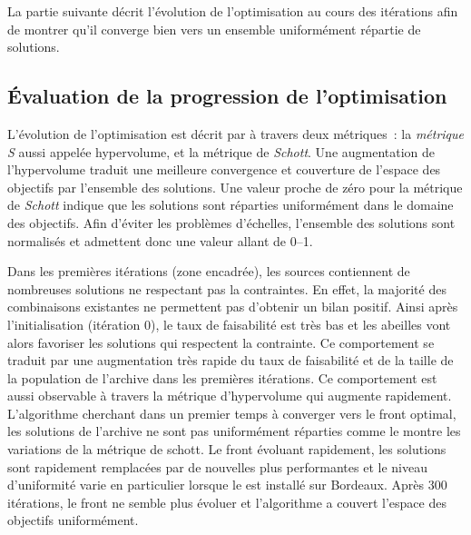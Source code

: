 La partie suivante décrit l’évolution de l’optimisation au cours des itérations
afin de montrer qu’il converge bien vers un ensemble uniformément répartie de solutions.



\subsection{Évaluation de la progression de l’optimisation} %
\label{sub:evaluation_de_la_progression_de_l_optimisation}
L’évolution de l’optimisation est décrit par  à
travers deux métriques~: la \textit{métrique S} aussi appelée hypervolume, et la métrique
de \textit{Schott}. Une augmentation de l’hypervolume traduit une meilleure convergence et
couverture de l’espace des objectifs par l’ensemble des solutions. Une valeur proche de
zéro pour la métrique de \textit{Schott} indique que les solutions sont réparties
uniformément dans le domaine des objectifs. Afin d’éviter les problèmes d’échelles,
l’ensemble des solutions sont normalisés et admettent donc une valeur allant de
\SIrange{0}{1}{}.

Dans les premières itérations (zone encadrée), les sources contiennent de nombreuses
solutions ne respectant pas la contraintes. En effet, la majorité des combinaisons
existantes ne permettent pas d’obtenir un bilan positif. Ainsi après l’initialisation
(itération $0$), le taux de faisabilité est très bas et les abeilles vont alors favoriser
les solutions qui respectent la contrainte. Ce comportement se traduit par une
augmentation très rapide du taux de faisabilité et de la taille de la population de
l’archive dans les premières itérations. Ce comportement est aussi observable à travers la
métrique d’hypervolume qui augmente rapidement. L’algorithme cherchant dans un premier
temps à converger vers le front optimal, les solutions de l’archive ne sont pas
uniformément réparties comme le montre les variations de la métrique de schott. Le front
évoluant rapidement, les solutions sont rapidement remplacées par de nouvelles plus
performantes et le niveau d’uniformité varie en particulier lorsque le
 est installé sur Bordeaux. Après $300$ itérations, le front ne semble plus
évoluer et l’algorithme a couvert l’espace des objectifs uniformément.

